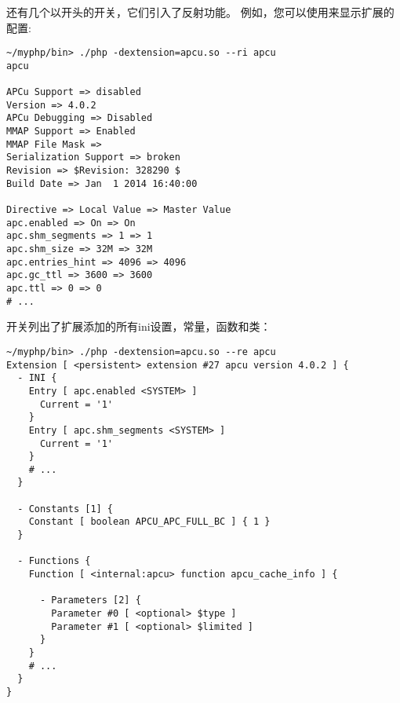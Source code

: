 还有几个以开头的开关，它们引入了反射功能。 例如，您可以使用来显示扩展的配置:

\begin{lstlisting}[language=shell]
~/myphp/bin> ./php -dextension=apcu.so --ri apcu
apcu

APCu Support => disabled
Version => 4.0.2
APCu Debugging => Disabled
MMAP Support => Enabled
MMAP File Mask =>
Serialization Support => broken
Revision => $Revision: 328290 $
Build Date => Jan  1 2014 16:40:00

Directive => Local Value => Master Value
apc.enabled => On => On
apc.shm_segments => 1 => 1
apc.shm_size => 32M => 32M
apc.entries_hint => 4096 => 4096
apc.gc_ttl => 3600 => 3600
apc.ttl => 0 => 0
# ...
\end{lstlisting}

开关列出了扩展添加的所有ini设置，常量，函数和类：

\begin{lstlisting}[language=shell]
~/myphp/bin> ./php -dextension=apcu.so --re apcu
Extension [ <persistent> extension #27 apcu version 4.0.2 ] {
  - INI {
    Entry [ apc.enabled <SYSTEM> ]
      Current = '1'
    }
    Entry [ apc.shm_segments <SYSTEM> ]
      Current = '1'
    }
    # ...
  }

  - Constants [1] {
    Constant [ boolean APCU_APC_FULL_BC ] { 1 }
  }

  - Functions {
    Function [ <internal:apcu> function apcu_cache_info ] {

      - Parameters [2] {
        Parameter #0 [ <optional> $type ]
        Parameter #1 [ <optional> $limited ]
      }
    }
    # ...
  }
}
\end{lstlisting}


